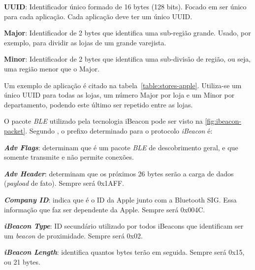 \begin{alineas}
	\item \textbf{UUID}: Identificador único formado de 16 bytes (128 bits). Focado em ser único para cada aplicação. Cada aplicação deve ter um único UUID.
	\item \textbf{Major}: Identificador de 2 bytes que identifica uma sub-região grande. Usado, por exemplo, para dividir as lojas de um grande varejista.
	\item \textbf{Minor}: Identificador de 2 bytes que identifica uma sub-divisão de região, ou seja, uma região menor que o Major.
\end{alineas}

Um exemplo de aplicação é citado na tabela~\ref{table:stores-apple}. Utiliza-se um único UUID para todas as lojas, um número Major por loja e um Minor por departamento, podendo este último ser repetido entre as lojas.

\begin{table}[htb]
\end{table}

O pacote \textit{BLE} utilizado pela tecnologia iBeacon pode ser visto na \autoref{fig:ibeacon-packet}. Segundo , o prefixo determinado para o protocolo \textit{iBeacon} é:

\begin{alineas}
	\item \textit{\textbf{Adv Flags}}: determinam que é um pacote \textit{BLE} de descobrimento geral, e que somente transmite e não permite conexões.
	\item \textit{\textbf{Adv Header}}: determinam que os próximos 26 bytes serão a carga de dados (\textit{payload} de fato). Sempre será 0x1AFF.
	\item \textit{\textbf{Company ID}}: indica que é o ID da Apple junto com a Bluetooth SIG. Essa informação que faz ser dependente da Apple. Sempre será 0x004C.
	\item\textit{\textbf{iBeacon Type}}: ID secundário utilizado por todos iBeacons que identificam ser um \textit{beacon} de proximidade. Sempre será 0x02.
	\item\textit{\textbf{iBeacon Length}}: identifica quantos bytes terão em seguida. Sempre será 0x15, ou 21 bytes.
\end{alineas}

